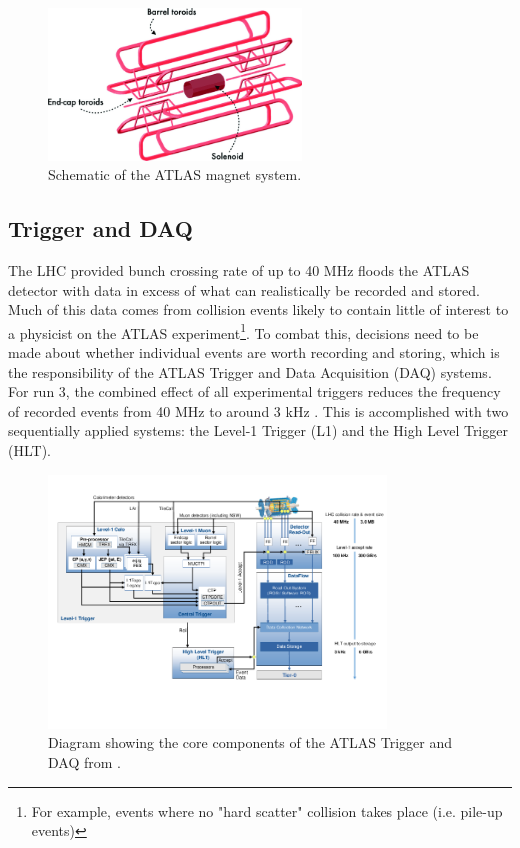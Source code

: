 \begin{figure}
\centering
    \includegraphics[width=0.6\textwidth]{images/ATLAS_Magnets.png}
    \caption{Schematic of the ATLAS magnet system.}
    \label{fig:ATLAS_Magnets}
\end{figure}

\subsection{Trigger and DAQ}

The LHC provided bunch crossing rate of up to 40 MHz floods the ATLAS detector with data in excess of what can 
realistically be recorded and stored. Much of this data comes from collision events likely to contain little of 
interest to a physicist on the ATLAS experiment\footnote{For example, events where no "hard scatter" collision 
takes place (i.e. pile-up events)}. To combat this, decisions need to be made about whether individual events are 
worth recording and storing, which is the responsibility of the ATLAS Trigger and Data Acquisition (DAQ) systems. For 
run 3, the combined effect of all experimental triggers reduces the frequency of recorded events from 40 MHz to 
around 3 kHz \cite{oliveiradamazio-trigger}. This is accomplished with two sequentially applied systems: the Level-1 
Trigger (L1) and the High Level Trigger (HLT). \par

\begin{figure}
\centering
    \includegraphics[width=0.8\textwidth]{images/Trigger_System.png}
    \caption{Diagram showing the core components of the ATLAS Trigger and DAQ from \cite{atlas-run3-setup}.}
    \label{fig:Trigger_System}
\end{figure}

